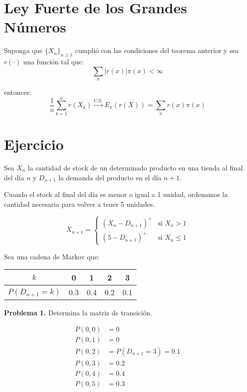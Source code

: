 \documentclass[12pt,a4paper]{article}
\begin{document}
\section*{Ley Fuerte de los Grandes Números}

Suponga que $\{X_n\}_{n \geq 1}$ cumplió con las condiciones del teorema anterior y sea $r(\cdot)$ una función tal que:
\begin{equation}
\sum_{x} |r(x)| \pi(x) < \infty
\end{equation}

entonces:
\begin{equation}
\frac{1}{n} \sum_{k=1}^{n} r(X_k) \xrightarrow{\text{C.S.}} E_{\pi}(r(X)) = \sum_{x} r(x) \pi(x)
\end{equation}

\section*{Ejercicio}

Sea $X_n$ la cantidad de stock de un determinado producto en una tienda al final del día $n$ y $D_{n+1}$ la demanda del producto en el día $n+1$.

Cuando el stock al final del día es menor o igual a 1 unidad, ordenamos la cantidad necesaria para volver a tener 5 unidades.

\begin{equation*}
X_{n+1} = \begin{cases}
(X_n - D_{n+1})^+ & \text{si } X_n > 1 \\
(5 - D_{n+1})^+ & \text{si } X_n \leq 1
\end{cases}
\end{equation*}

Sea una cadena de Markov que:

\begin{center}
\begin{tabular}{|c|c|c|c|c|}
\hline
$k$ & 0 & 1 & 2 & 3 \\
\hline
$P(D_{n+1}=k)$ & 0.3 & 0.4 & 0.2 & 0.1 \\
\hline
\end{tabular}
\end{center}

\textbf{Problema 1.} Determina la matriz de transición.

\begin{align*}
P(0,0) &= 0 \\
P(0,1) &= 0 \\
P(0,2) &= P(D_{n+1}=3) = 0.1 \\
P(0,3) &= 0.2 \\
P(0,4) &= 0.4 \\
P(0,5) &= 0.3
\end{align*}
\end{document}
